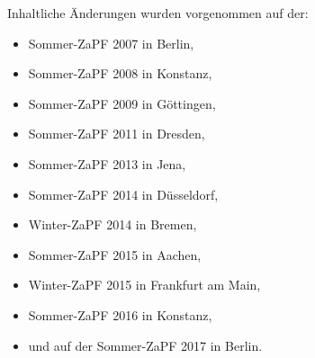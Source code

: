 \documentclass[12pt,oneside]{scrartcl}
\begin{document}
Inhaltliche Änderungen wurden vorgenommen auf der:
%
\begin{itemize}

\item Sommer-ZaPF 2007 in Berlin,

\item Sommer-ZaPF 2008 in Konstanz,

\item Sommer-ZaPF 2009 in Göttingen,

\item Sommer-ZaPF 2011 in Dresden,

\item Sommer-ZaPF 2013 in Jena,

\item Sommer-ZaPF 2014 in Düsseldorf,

\item Winter-ZaPF 2014 in Bremen,

\item Sommer-ZaPF 2015 in Aachen,

\item Winter-ZaPF 2015 in Frankfurt am Main,

\item Sommer-ZaPF 2016 in Konstanz,

\item und auf der Sommer-ZaPF 2017 in Berlin.

\end{itemize}
\end{document}

